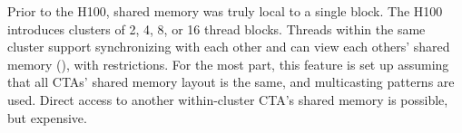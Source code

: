 \filbreak
{}

Prior to the H100, shared memory was truly local to a single block.
The H100 introduces clusters of 2, 4, 8, or 16 thread blocks.
Threads within the same cluster support synchronizing with each other and can view each others' shared memory (), with restrictions.
For the most part, this feature is set up assuming that all CTAs' shared memory layout is the same, and multicasting patterns are used.
Direct access to another within-cluster CTA's shared memory is possible, but expensive.



